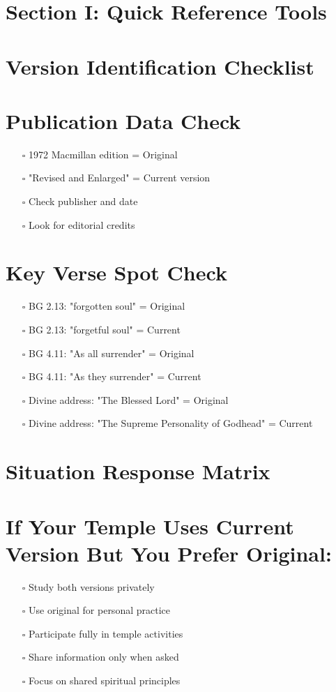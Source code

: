 \documentclass[11pt,twoside]{book}
\begin{document}
\section*{Section I: Quick Reference Tools}
\label{sec:org3b454a6}

\section*{Version Identification Checklist}
\label{sec:orgf126c30}

\section*{Publication Data Check}
\label{sec:orge6b3f28}
\begin{itemize}
\item[{$\square$}] 1972 Macmillan edition = Original
\item[{$\square$}] "Revised and Enlarged" = Current version
\item[{$\square$}] Check publisher and date
\item[{$\square$}] Look for editorial credits
\end{itemize}
\section*{Key Verse Spot Check}
\label{sec:org00c4ab5}
\begin{itemize}
\item[{$\square$}] BG 2.13: "forgotten soul" = Original
\item[{$\square$}] BG 2.13: "forgetful soul" = Current
\item[{$\square$}] BG 4.11: "As all surrender" = Original
\item[{$\square$}] BG 4.11: "As they surrender" = Current
\item[{$\square$}] Divine address: "The Blessed Lord" = Original
\item[{$\square$}] Divine address: "The Supreme Personality of Godhead" = Current
\end{itemize}
\section*{Situation Response Matrix}
\label{sec:org7cfba57}

\section*{If Your Temple Uses Current Version But You Prefer Original:}
\label{sec:org90a0153}
\begin{itemize}
\item[{$\square$}] Study both versions privately
\item[{$\square$}] Use original for personal practice
\item[{$\square$}] Participate fully in temple activities
\item[{$\square$}] Share information only when asked
\item[{$\square$}] Focus on shared spiritual principles
\end{itemize}
\end{document}
